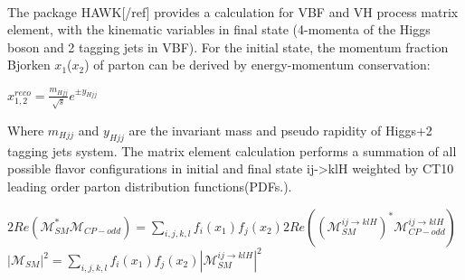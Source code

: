 \paragraph{}The package HAWK[/ref] provides a calculation for VBF and VH process matrix element, with the kinematic variables in final state (4-momenta of the Higgs boson and 2 tagging jets in VBF). For the initial state, the momentum fraction Bjorken $x_1$($x_2$) of parton can be derived by energy-momentum conservation: 

\begin{center}
\begin{math}
x_{1,2}^{reco}=\frac{m_{Hjj}}{\sqrt{s}}e^{\pm y_{Hjj}}
\end{math}
\end{center}

Where $m_{Hjj}$ and $y_{Hjj}$ are the invariant mass and pseudo rapidity of Higgs+2 tagging jets system. The matrix element calculation performs a summation of all possible flavor configurations in initial and final state ij->klH weighted by CT10 leading order parton distribution functions(PDFs.). 

\begin{center}
\begin{math}
2Re(\mathcal{M}^{\ast}_{SM}\mathcal{M}_{CP-odd}) = \sum_{i,j,k,l} f_i(x_1)f_j(x_2)2Re((\mathcal{M}_{SM}^{ij \to klH})^{\ast} \mathcal{M}_{CP-odd}^{ij\to klH} ) 
\end{math}
\\
\begin{math}
|\mathcal{M}_{SM}|^2 = \sum_{i,j,k,l} f_i(x_1)f_j(x_2)|\mathcal{M}_{SM}^{ij \to klH}|^2
\end{math}
\end{center}




